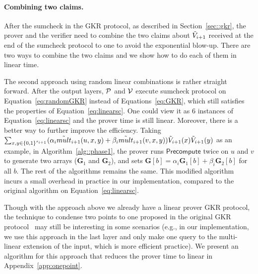 \paragraph{Combining two claims.} After the sumcheck in the GKR protocol, as described in Section~\ref{sec::gkr}, the prover and the verifier need to combine the two claims about $\tV_{i+1}$ received at the end of the sumcheck protocol to one to avoid the exponential blow-up. There are two ways to combine the two claims and we show how to do each of them in linear time. 

The second approach using random linear combinations is rather straight forward. After the output layers, $\P$ and $\V$ execute sumcheck protocol on Equation~\ref{eq:randomGKR} instead of Equations~\ref{eq:GKR}, which still satisfies the properties of Equation~\ref{eq:linearsc}. One could view it as 6 instances of Equation~\ref{eq:linearsc} and the prover time is still linear. Moreover, there is a better way to further improve the efficiency. Taking $\sum_{x, y \in\binary^{s_{i+1}}}(\alpha_i\tmult_{i+1}(u,x,y)+\beta_i\tmult_{i+1}(v,x,y))\tV_{i+1}(x)\tV_{i+1}(y)$ as an example, in Algorithm~\ref{alg::phase1}, the prover runs $\mathsf{Precompute}$ twice on $u$ and $v$ to generate two arrays ($\textbf{G}_1$ and $\textbf{G}_2$), and sets $\textbf{G}[b]=\alpha_i \textbf{G}_1[b] + \beta_i\textbf{G}_2[b]$ for all $b$. The rest of the algorithms remains the same. This modified algorithm incurs a small overhead in practice in our implementation, compared to the original algorithm on Equation~\ref{eq:linearsc}.

Though with the approach above we already have a linear prover GKR protocol, the technique to condense two points to one proposed in the original GKR protocol~\cite{GKR} may still be interesting in some scenarios (e.g., in our implementation, we use this approach in the last layer and only make one query to the multi-linear extension of the input, which is more efficient practice). We present an algorithm for this approach that reduces the prover time to linear in Appendix~\ref{app:onepoint}.





